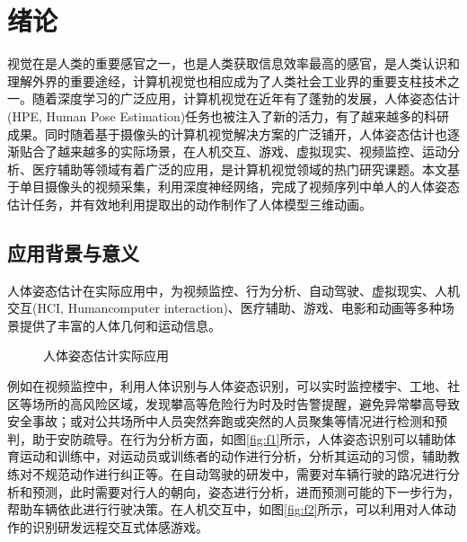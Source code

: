 
\chapter{绪论}

视觉在是人类的重要感官之一，也是人类获取信息效率最高的感官，是人类认识和理解外界的重要途经，计算机视觉也相应成为了人类社会工业界的重要支柱技术之一。随着深度学习的广泛应用，计算机视觉在近年有了蓬勃的发展，人体姿态估计(HPE, Human Pose Estimation)任务也被注入了新的活力，有了越来越多的科研成果。同时随着基于摄像头的计算机视觉解决方案的广泛铺开，人体姿态估计也逐渐贴合了越来越多的实际场景，在人机交互、游戏、虚拟现实、视频监控、运动分析、医疗辅助等领域有着广泛的应用，是计算机视觉领域的热门研究课题。本文基于单目摄像头的视频采集，利用深度神经网络，完成了视频序列中单人的人体姿态估计任务，并有效地利用提取出的动作制作了人体模型三维动画。



\section{应用背景与意义}


人体姿态估计在实际应用中，为视频监控、行为分析、自动驾驶、虚拟现实、人机交互(HCI, Humancomputer interaction)、医疗辅助、游戏、电影和动画等多种场景提供了丰富的人体几何和运动信息。
\begin{figure}[h!]
  \centering
  \caption{人体姿态估计实际应用}
\end{figure}
例如在视频监控中，利用人体识别与人体姿态识别，可以实时监控楼宇、工地、社区等场所的高风险区域，发现攀高等危险行为时及时告警提醒，避免异常攀高导致安全事故；或对公共场所中人员突然奔跑或突然的人员聚集等情况进行检测和预判，助于安防疏导。在行为分析方面，如图\ref{fig:f1}所示，人体姿态识别可以辅助体育运动和训练中，对运动员或训练者的动作进行分析，分析其运动的习惯，辅助教练对不规范动作进行纠正等。在自动驾驶的研发中，需要对车辆行驶的路况进行分析和预测，此时需要对行人的朝向，姿态进行分析，进而预测可能的下一步行为，帮助车辆依此进行行驶决策。在人机交互中，如图\ref{fig:f2}所示，可以利用对人体动作的识别研发远程交互式体感游戏。

